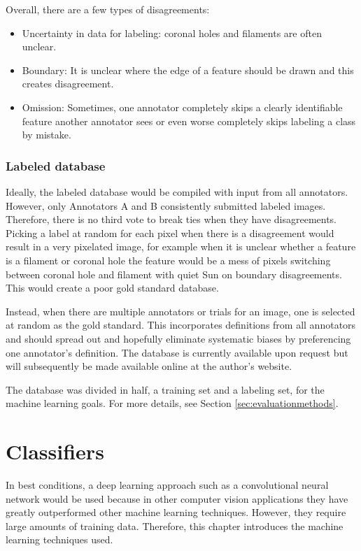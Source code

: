 \documentclass[twoside]{report}
\begin{document}
Overall, there are a few types of disagreements:
\begin{itemize}
\item Uncertainty in data for labeling: coronal holes and filaments are often unclear. 
\item Boundary: It is unclear where the edge of a feature should be drawn and this creates disagreement. 
\item Omission: Sometimes, one annotator completely skips a clearly identifiable feature another annotator sees or even worse completely skips labeling a class by mistake. 
\end{itemize}

\subsection{Labeled database}
Ideally, the labeled database would be compiled with input from all annotators. However, only Annotators A and B consistently submitted labeled images. Therefore, there is no third vote to break ties when they have disagreements. Picking a label at random for each pixel when there is a disagreement would result in a very pixelated image, for example when it is unclear whether a feature is a filament or coronal hole the feature would be a mess of pixels switching between coronal hole and filament with quiet Sun on boundary disagreements. This would create a poor gold standard database.

Instead, when there are multiple annotators or trials for an image, one is selected at random as the gold standard. This incorporates definitions from all annotators and should spread out and hopefully eliminate systematic biases by preferencing one annotator's definition. The database is currently available upon request but will subsequently be made available online at the author's website. 

The database was divided in half, a training set and a labeling set, for the machine learning goals. For more details, see Section \ref{sec:evaluationmethods}. 


\chapter{Classifiers} \label{ch:classifiers}

In best conditions, a deep learning approach such as a convolutional neural network would be used because in other computer vision applications they have greatly outperformed other machine learning techniques. However, they require large amounts of training data. Therefore, this chapter introduces the machine learning techniques used. 
\end{document}
